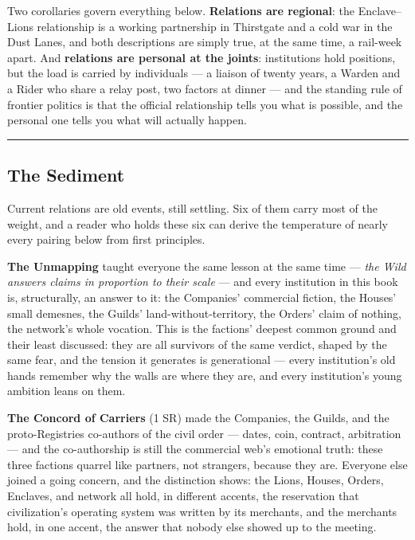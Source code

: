 Two corollaries govern everything below. \textbf{Relations are regional}: the Enclave--Lions relationship is a working partnership in Thirstgate and a cold war in the Dust Lanes, and both descriptions are simply true, at the same time, a rail-week apart. And \textbf{relations are personal at the joints}: institutions hold positions, but the load is carried by individuals --- a liaison of twenty years, a Warden and a Rider who share a relay post, two factors at dinner --- and the standing rule of frontier politics is that the official relationship tells you what is possible, and the personal one tells you what will actually happen.

\medskip\hrule\medskip

\subsection{The Sediment}

Current relations are old events, still settling. Six of them carry most of the weight, and a reader who holds these six can derive the temperature of nearly every pairing below from first principles.

\textbf{The Unmapping} taught everyone the same lesson at the same time --- \textit{the Wild answers claims in proportion to their scale} --- and every institution in this book is, structurally, an answer to it: the Companies' commercial fiction, the Houses' small demesnes, the Guilds' land-without-territory, the Orders' claim of nothing, the network's whole vocation. This is the factions' deepest common ground and their least discussed: they are all survivors of the same verdict, shaped by the same fear, and the tension it generates is generational --- every institution's old hands remember why the walls are where they are, and every institution's young ambition leans on them.

\textbf{The Concord of Carriers} (1 SR) made the Companies, the Guilds, and the proto-Registries co-authors of the civil order --- dates, coin, contract, arbitration --- and the co-authorship is still the commercial web's emotional truth: these three factions quarrel like partners, not strangers, because they are. Everyone else joined a going concern, and the distinction shows: the Lions, Houses, Orders, Enclaves, and network all hold, in different accents, the reservation that civilization's operating system was written by its merchants, and the merchants hold, in one accent, the answer that nobody else showed up to the meeting.

